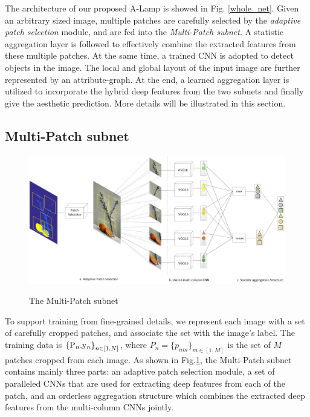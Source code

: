 \documentclass[10pt,twocolumn,letterpaper]{article}
\begin{document}
The architecture of our proposed A-Lamp is showed in Fig. \ref{whole_net}. Given an arbitrary sized image, multiple patches are carefully selected by the \textit{adaptive patch selection} module, and are fed into the \textit{Multi-Patch subnet}. A statistic aggregation layer is followed to effectively combine the extracted features from these multiple patches.
At the same time, a trained CNN is adopted to detect objects in the image. The local and global layout of the input image are further represented by an attribute-graph. At the end, a learned aggregation layer is utilized to incorporate the hybrid deep features from the two subnets and finally give the aesthetic prediction. More details will be illustrated in this section. 

\subsection{Multi-Patch subnet}

\begin{figure}
	\centering
	\includegraphics[scale=0.35]{figures/multi_patch_subnet.jpg}
	\label{multi_patch}
	\caption{The Multi-Patch subnet}
\end{figure}

To support training from fine-grained details, we represent each image with a set of carefully cropped patches, and associate the set with the image's label.
The training data is ${{\rm{\{ }}{{\rm{P}}_n}{\rm{, }}{{\rm{y}}_n}{\rm{\} }}_{n \in [1,N]}}$, where ${P_n} = {\{ {p_{nm}}\} _{m \in [1,M]}}$ is the set of $M$ patches cropped from each image. 
As shown in Fig.\ref{multi_patch}, the Multi-Patch subnet contains mainly three parts: an adaptive patch selection module, a set of paralleled CNNs that are used for extracting deep features from each of the patch, and an orderless aggregation structure which combines the extracted deep features from the multi-column CNNs jointly.
\end{document}
